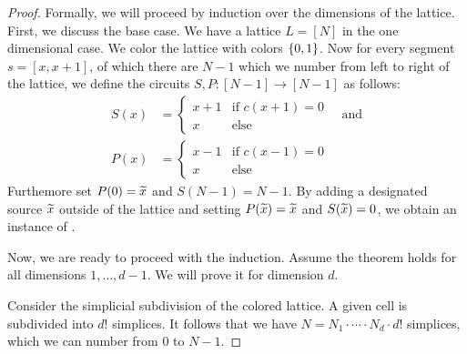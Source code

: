 \begin{proof}
	Formally, we will proceed by induction over the dimensions of the lattice. First, we discuss the base case. We have a lattice $L = [N]$ in the one dimensional case. We color the lattice with colors $\left\{0, 1\right\}$. Now for every segment $s = [x, x+1]$, of which there are $N-1$ which we number from left to right of the lattice, we define the circuits $S, P : [N-1] \rightarrow [N-1]$ as follows:
	\begin{align*}
		S(x) & = \begin{cases}
			         x + 1 & \text{if $c(x+1) = 0$} \\
			         x     & \text{else}
		         \end{cases} \quad \text{and} \\
		P(x) & = \begin{cases}
			         x - 1 & \text{if $c(x-1) = 0$} \\
			         x     & \text{else}
		         \end{cases}
	\end{align*}
	Furthemore set $P(0) = \widetilde{x}$ and $S(N-1) = N-1$. By adding a designated source $\widetilde{x}$ outside of the lattice and setting $P(\widetilde{x}) = \widetilde{x}$ and $S(\widetilde{x}) = 0$, we obtain an instance of \EndOfLine.

	Now, we are ready to proceed with the induction. Assume the theorem holds for all dimensions $1, \dots, d-1$. We will prove it for dimension $d$.

	Consider the simplicial subdivision of the colored lattice. A given cell is subdivided into $d!$ simplices. It follows that we have $N = N_1 \cdot \cdots \cdot N_d \cdot d!$ simplices, which we can number from $0$ to $N-1$.


\end{proof}
